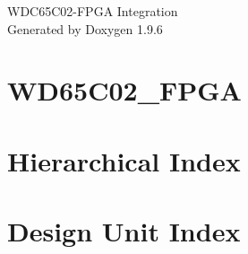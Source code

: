 \documentclass[twoside]{book}
\newcommand{\+}{\discretionary{\mbox{\scriptsize$\hookleftarrow$}}{}{}}
\newcommand{\clearemptydoublepage}{%
    \newpage{\pagestyle{empty}\cleardoublepage}%
  }
\begin{document}
  \raggedbottom
    \hypersetup{pageanchor=false,
                bookmarksnumbered=true,
                pdfencoding=unicode
               }
  \begin{titlepage}
  \vspace*{7cm}
  \begin{center}%
  {\Large WDC65\+C02-\/\+FPGA Integration}\\
  \vspace*{1cm}
  {\large Generated by Doxygen 1.9.6}\\
  \end{center}
  \end{titlepage}
  \clearemptydoublepage
  \tableofcontents
  \clearemptydoublepage
  \hypersetup{pageanchor=true}
\chapter{WD65\+C02\+\_\+\+FPGA}
\label{index}\hypertarget{index}{}
\chapter{Hierarchical Index}

\chapter{Design Unit Index}

\end{document}
